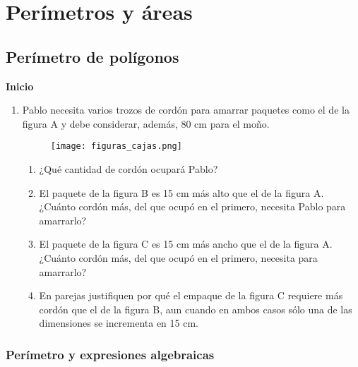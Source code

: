 \thispagestyle{plain}
\section{Perímetros y áreas}

\subsection{Perímetro de polígonos}

\begin{boxK}
    \begin{center}\textbf{Inicio}\end{center}

    \begin{enumerate}
        \item Pablo necesita varios trozos de cordón para amarrar paquetes como el de la figura A y
              debe considerar, además, 80 cm para el moño.
              \begin{figure}[H]
                  \centering
                  \texttt{[image: figuras\_cajas.png]}
                  \label{fig:figuras_cajas}
              \end{figure}
              \begin{enumerate}
                  \item ¿Qué cantidad de cordón ocupará Pablo?
                  \item El paquete de la figura B es 15 cm más alto que el de la figura A. ¿Cuánto cordón más, del que ocupó en el primero, necesita Pablo para amarrarlo?
                  \item El paquete de la figura C es 15 cm más ancho que el de la figura A. ¿Cuánto cordón más, del que ocupó en el primero, necesita para amarrarlo?
                  \item En parejas justifiquen por qué el empaque de la figura C requiere más cordón que el de la figura B, aun cuando en ambos casos sólo una de las dimensiones se incrementa en 15 cm.
              \end{enumerate}
    \end{enumerate}
\end{boxK}

\subsubsection{Perímetro y expresiones algebraicas}

